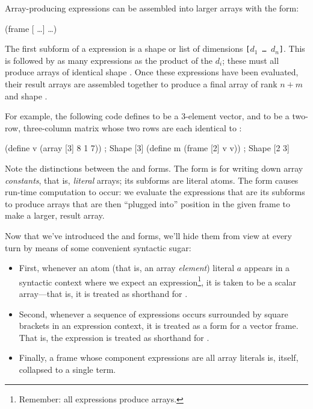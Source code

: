 {\newcommand{\dpr}[1]{\ensuremath{{d^{\prime}}_{#1}}}

Array-producing expressions can be assembled into larger arrays with
the  form:
\begin{code}
(frame [ \ldots]  \ldots)\end{code}
The first subform of a  expression is a shape or list of dimensions
\texttt{[$d_1$ {\ldots} $d_n$]}.
This is followed by as many expressions as the product of the $d_i$;
these must all produce arrays of
identical shape \ex{[\dpr{1} {\ldots} \dpr{m}]}.
Once these expressions have been evaluated,
their result arrays are assembled together to produce a final array
of rank $n+m$ and
shape \ex{[$d_1$ {\ldots} $d_n$ $\dpr{1}$ {\ldots} $\dpr{m}$]}.

}

For example, the following code defines  to be a 3-element vector,
and  to be a two-row, three-column matrix whose two rows are
each identical to :
\begin{code}
    (define v (array [3] 8 1 7)) ; Shape [3]
    (define m (frame [2] v v))   ; Shape [2 3]\end{code}

Note the distinctions between the  and  forms.
The  form is for writing down array \emph{constants},
that is, \emph{literal} arrays; its subforms are literal atoms.
The  form causes run-time computation to occur:
  we evaluate the expressions that are its subforms to produce
  arrays that are then ``plugged into'' position in the given
  frame to make a larger, result array.

Now that we've introduced the  and  forms,
we'll hide them from view at every turn 
by means of some convenient syntactic sugar:
\begin{itemize}
\item First, whenever an atom (that is, an array \emph{element}) literal $a$
appears in a syntactic context where we expect an expression\footnote{Remember:
all expressions produce arrays.},
it is taken to be a scalar array---that is,
it is treated as shorthand for .
\item Second, whenever a sequence of expressions occurs surrounded
by square brackets in an expression context,
it is treated as a  form for a vector frame.
That is, the expression \ex{[$e_1$ {\ldots} $e_n$]}
is treated as shorthand for .
\item Finally, a frame whose component expressions are all array literals
is, itself, collapsed to a single  term.
\end{itemize}

